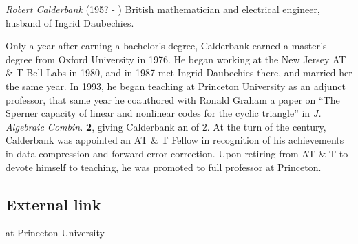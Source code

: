 \documentclass[12pt]{article}
\begin{document}
\emph{Robert Calderbank} (195? - ) British mathematician and electrical engineer, husband of Ingrid Daubechies.

Only a year after earning a bachelor's degree, Calderbank earned a master's degree from Oxford University in 1976. He began working at the New Jersey AT \& T Bell Labs in 1980, and in 1987 met Ingrid Daubechies there, and married her the same year. In 1993, he began teaching at Princeton University as an adjunct professor, that same year he coauthored with Ronald Graham a paper on ``The Sperner capacity of linear and nonlinear codes for the cyclic triangle'' in {\it J. Algebraic Combin.} {\bf 2}, giving Calderbank an  of 2. At the turn of the century, Calderbank was appointed an AT \& T Fellow in recognition of his achievements in data compression and forward error correction. Upon retiring from AT \& T to devote himself to teaching, he was promoted to full professor at Princeton.

\subsection{External link}

 at Princeton University
\end{document}
